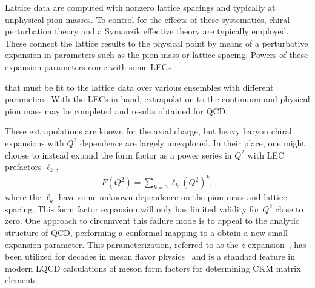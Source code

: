 
Lattice data are computed with nonzero lattice spacings and typically at unphysical pion masses.
To control for the effects of these systematics,
 chiral perturbation theory and a Symanzik effective theory are typically employed.
These connect the lattice results to the physical point by means
 of a perturbative expansion in parameters such as the pion mass or lattice spacing.
Powers of these expansion parameters come with some LECs%
\begin{marginnote}
\end{marginnote}%
 that must be fit to the lattice data over various ensembles with different parameters.
With the LECs in hand, extrapolation to the continuum and physical pion mass
 may be completed and results obtained for QCD.

These extrapolations are known for the axial charge,
 but heavy baryon chiral expansions with $Q^2$ dependence are largely unexplored.
In their place, one might choose to instead expand the form factor as
 a power series in $Q^2$ with LEC prefactors $\ell_k$,
\begin{align}
 F(Q^2) = \sum_{k=0} \ell_k (Q^2)^k,
\end{align}
 where the $\ell_k$ have some unknown dependence on the pion mass and lattice spacing.
This form factor expansion will only has limited validity for $Q^2$ close to zero.
One approach to circumvent this failure mode is to appeal to the analytic structure of QCD,
 performing a conformal mapping to a obtain a new small expansion parameter.
This parameterization, referred to as the $z$ expansion~\cite{Bhattacharya:2011ah},
 has been utilized for decades in meson flavor physics~\cite{Okubo:1971jf}
 and is a standard feature in modern LQCD calculations of meson form factors
 for determining CKM matrix elements.

